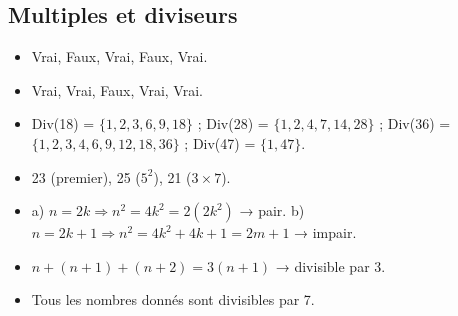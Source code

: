 \documentclass[12pt,a4paper]{article}
\begin{document}
\subsection*{Multiples et diviseurs}
\begin{itemize}
    \item Vrai, Faux, Vrai, Faux, Vrai.  
    \item Vrai, Vrai, Faux, Vrai, Vrai.  
    \item Div(18) = $\{1,2,3,6,9,18\}$ ; Div(28) = $\{1,2,4,7,14,28\}$ ; Div(36) = $\{1,2,3,4,6,9,12,18,36\}$ ; Div(47) = $\{1,47\}$.  
    \item 23 (premier), 25 ($5^2$), 21 ($3\times7$).  
    \item a) $n=2k \Rightarrow n^2=4k^2=2(2k^2)$ → pair.  
          b) $n=2k+1 \Rightarrow n^2=4k^2+4k+1=2m+1$ → impair.  
    \item $n+(n+1)+(n+2)=3(n+1)$ → divisible par 3.  
    \item Tous les nombres donnés sont divisibles par 7.  
\end{itemize}
\end{document}
